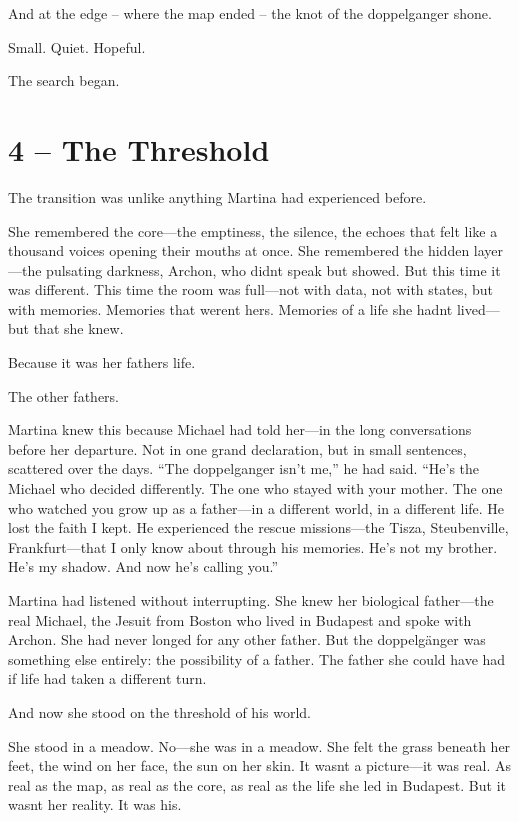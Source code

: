 \documentclass[
]{article}
\begin{document}
And at the edge -- where the map ended -- the knot of the doppelganger shone.

Small. Quiet. Hopeful.

The search began.

\section{4 -- The Threshold}\label{the-threshold}

The transition was unlike anything Martina had experienced before.

She remembered the core---the emptiness, the silence, the echoes that felt like a thousand voices opening their mouths at once. She remembered the hidden layer---the pulsating darkness, Archon, who didn\textquotesingle t speak but showed. But this time it was different. This time the room was full---not with data, not with states, but with memories. Memories that weren\textquotesingle t hers. Memories of a life she hadn\textquotesingle t lived---but that she knew.

Because it was her father\textquotesingle s life.

The other father\textquotesingle s.

Martina knew this because Michael had told her---in the long conversations before her departure. Not in one grand declaration, but in small sentences, scattered over the days. ``The doppelganger isn't me,'' he had said. ``He's the Michael who decided differently. The one who stayed with your mother. The one who watched you grow up as a father---in a different world, in a different life. He lost the faith I kept. He experienced the rescue missions---the Tisza, Steubenville, Frankfurt---that I only know about through his memories. He's not my brother. He's my shadow. And now he's calling you.''

Martina had listened without interrupting. She knew her biological father---the real Michael, the Jesuit from Boston who lived in Budapest and spoke with Archon. She had never longed for any other father. But the doppelgänger was something else entirely: the possibility of a father. The father she could have had if life had taken a different turn.

And now she stood on the threshold of his world.

She stood in a meadow. No---she was in a meadow. She felt the grass beneath her feet, the wind on her face, the sun on her skin. It wasn\textquotesingle t a picture---it was real. As real as the map, as real as the core, as real as the life she led in Budapest. But it wasn\textquotesingle t her reality. It was his.
\end{document}

